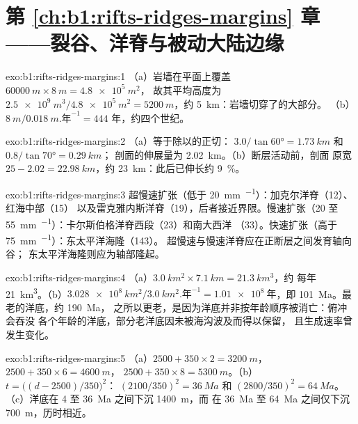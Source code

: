 \section*{第 \ref{ch:b1:rifts-ridges-margins} 章——裂谷、洋脊与被动大陆边缘}

\begin{solution}{exo:b1:rifts-ridges-margins:1}
（a）岩墙在平面上覆盖 $\qty{60000}{m}\times\qty{8}{m} = \qty{4.8e5}{m^2}$，
故其平均高度为 $\qty{2.5e9}{m^3}/\qty{4.8e5}{m^2} =
\qty{5200}{m}$，约 \qty{5}{km}：岩墙切穿了的大部分。
（b）$\qty{8}{m}/\qty{0.018}{m.\text{年}^{-1}} = 444$ 年，约四个世纪。
\end{solution}

\begin{solution}{exo:b1:rifts-ridges-margins:2}
（a）等于除以的正切：
$3.0/\tan\ang{60} = \qty{1.73}{km}$ 和 $0.8/\tan\ang{70} = \qty{0.29}{km}$；
剖面的伸展量为 \qty{2.02}{km}。（b）断层活动前，剖面
原宽 $25 - 2.02 = \qty{22.98}{km}$，约 \qty{23}{km}：此后已伸长约
\qty{9}{\percent}。
\end{solution}

\begin{solution}{exo:b1:rifts-ridges-margins:3}
超慢速扩张（低于 \qty{20}{mm.^{-1}}）：加克尔洋脊（12）、红海中部（15）
以及雷克雅内斯洋脊（19），后者接近界限。慢速扩张（20 至
\qty{55}{mm.^{-1}}）：卡尔斯伯格洋脊西段（23）和南大西洋
（33）。快速扩张（高于 \qty{75}{mm.^{-1}}）：东太平洋海隆（143）。
超慢速与慢速洋脊应在正断层之间发育轴向谷；
东太平洋海隆则应为轴部隆起。
\end{solution}

\begin{solution}{exo:b1:rifts-ridges-margins:4}
（a）$\qty{3.0}{km^2}\times\qty{7.1}{km} = \qty{21.3}{km^3}$，约
每年 \qty{21}{km^3}。（b）$\qty{3.028e8}{km^2}/\qty{3.0}{km^2.\text{年}^{-1}} =
\qty{1.01e8}{\text{年}}$，即 \qty{101}{Ma}。最老的洋底，约 \qty{190}{Ma}，
之所以更老，是因为洋底并非按年龄顺序被消亡：俯冲会吞没
各个年龄的洋底，部分老洋底因未被海沟波及而得以保留，
且生成速率曾发生变化。
\end{solution}

\begin{solution}{exo:b1:rifts-ridges-margins:5}
（a）$2500 + 350\times2 = \qty{3200}{m}$，$2500 + 350\times6 = \qty{4600}{m}$，
$2500 + 350\times8 = \qty{5300}{m}$。（b）$t = \bigl((d - 2500)/350\bigr)^2$：
$(2100/350)^2 = \qty{36}{Ma}$ 和 $(2800/350)^2 = \qty{64}{Ma}$。
（c）洋底在 4 至 \qty{36}{Ma} 之间下沉 \qty{1400}{m}，而
在 \qty{36}{Ma} 至 \qty{64}{Ma} 之间仅下沉 \qty{700}{m}，历时相近。
\end{solution}

